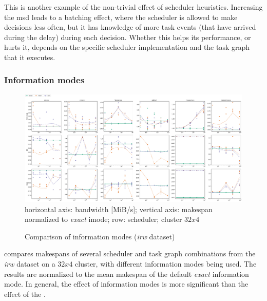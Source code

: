 This is another example of the non-trivial effect of scheduler heuristics. Increasing the
\gls{msd} leads to a batching effect, where the scheduler is allowed to make
decisions less often, but it has knowledge of more task events (that have arrived during the delay)
during each decision. Whether this helps its performance, or hurts it, depends on the specific
scheduler implementation and the task graph that it executes.

\subsubsection*{Information modes}

\begin{figure}
	\centering
	\includegraphics[width=\textwidth]{imgs/estee/charts/irw-32x4-imode-score}\\
	{\small horizontal axis: bandwidth [MiB/s]; vertical axis: makespan normalized to
	\emph{exact}
	imode; row: scheduler; cluster $32x4$} \caption{Comparison of information modes (\emph{irw} dataset)}
	\label{fig:estee-chart-irw-imode}
\end{figure}


 compares makespans of several scheduler and task graph combinations
from the \emph{irw} dataset on a $32x4$ cluster, with different
information modes being used. The results are normalized to the mean makespan of the default
\emph{exact} information mode. In general, the effect of information modes is more
significant than the effect of the .

